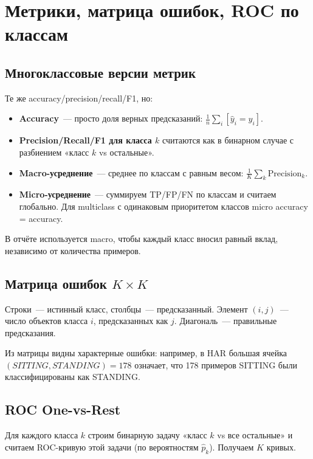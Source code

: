 \documentclass[12pt,a4paper]{article}
\begin{document}
\section{Метрики, матрица ошибок, ROC по классам}

\subsection{Многоклассовые версии метрик}

Те же accuracy/precision/recall/F1, но:
\begin{itemize}
  \item \textbf{Accuracy}~--- просто доля верных предсказаний:
    $\frac{1}{n}\sum_i [\hat{y}_i = y_i]$.
  \item \textbf{Precision/Recall/F1 для класса $k$} считаются как в бинарном случае с разбиением «класс $k$ vs остальные».
  \item \textbf{Macro-усреднение}~--- среднее по классам с равным весом: $\frac{1}{K}\sum_k \text{Precision}_k$.
  \item \textbf{Micro-усреднение}~--- суммируем TP/FP/FN по классам и считаем глобально. Для multiclass с одинаковым приоритетом классов micro accuracy = accuracy.
\end{itemize}

В отчёте используется macro, чтобы каждый класс вносил равный вклад, независимо от количества примеров.

\subsection{Матрица ошибок $K \times K$}

Строки~--- истинный класс, столбцы~--- предсказанный. Элемент $(i, j)$~--- число объектов класса $i$, предсказанных как $j$. Диагональ~--- правильные предсказания.

Из матрицы видны характерные ошибки: например, в HAR большая ячейка $(SITTING, STANDING) = 178$ означает, что 178 примеров SITTING были классифицированы как STANDING.

\subsection{ROC One-vs-Rest}

Для каждого класса $k$ строим бинарную задачу «класс $k$ vs все остальные» и считаем ROC-кривую этой задачи (по вероятностям $\hat{p}_k$). Получаем $K$ кривых.
\end{document}
